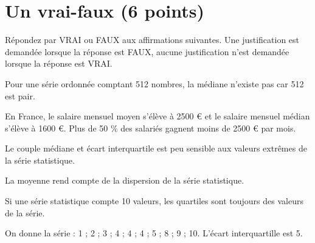 
\section{Un vrai-faux (6 points)}


Répondez par VRAI ou FAUX aux affirmations suivantes. Une justification est demandée lorsque la réponse est FAUX, aucune justification n'est demandée lorsque la réponse est VRAI.

\begin{questions}
	\question[1] Pour une série ordonnée comptant 512 nombres, la médiane n'existe pas car 512 est pair.
	
	\question[1] En France, le salaire mensuel moyen s'élève à \num{2500} € et le salaire mensuel médian s'élève à \num{1600} €. Plus de 50 \% des salariés gagnent moins de \num{2500} € par mois.
	
	\question[1] Le couple médiane et écart interquartile est peu sensible aux valeurs extrêmes de la série statistique.
	

	\question[1] La moyenne rend compte de la dispersion de la série statistique.
	
	\question[1] Si une série statistique compte 10 valeurs, les quartiles sont toujours des valeurs de la série.
	
	\question[1] On donne la série : 1 ; 2 ; 3 ; 4 ; 4 ; 4 ; 5 ; 8 ; 9 ; 10. L'écart interquartille est 5.
\end{questions}